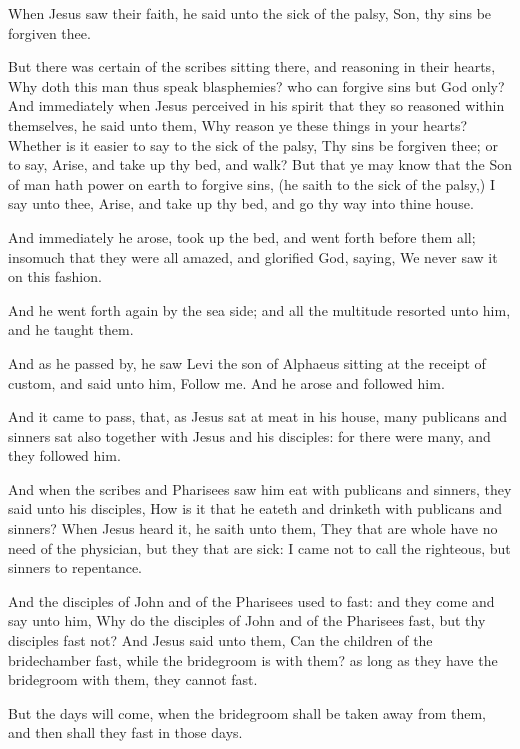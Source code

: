 \verse When Jesus saw their faith, he said unto the sick of the palsy, Son, thy sins be forgiven thee.

\verse But there was certain of the scribes sitting there, and reasoning in their hearts, \verse Why doth this man thus speak blasphemies? who can forgive sins but God only?  \verse And immediately when Jesus perceived in his spirit that they so reasoned within themselves, he said unto them, Why reason ye these things in your hearts?  \verse Whether is it easier to say to the sick of the palsy, Thy sins be forgiven thee; or to say, Arise, and take up thy bed, and walk?  \verse But that ye may know that the Son of man hath power on earth to forgive sins, (he saith to the sick of the palsy,) \verse I say unto thee, Arise, and take up thy bed, and go thy way into thine house.

\verse And immediately he arose, took up the bed, and went forth before them all; insomuch that they were all amazed, and glorified God, saying, We never saw it on this fashion.

\verse And he went forth again by the sea side; and all the multitude resorted unto him, and he taught them.

\verse And as he passed by, he saw Levi the son of Alphaeus sitting at the receipt of custom, and said unto him, Follow me. And he arose and followed him.

\verse And it came to pass, that, as Jesus sat at meat in his house, many publicans and sinners sat also together with Jesus and his disciples: for there were many, and they followed him.

\verse And when the scribes and Pharisees saw him eat with publicans and sinners, they said unto his disciples, How is it that he eateth and drinketh with publicans and sinners?  \verse When Jesus heard it, he saith unto them, They that are whole have no need of the physician, but they that are sick: I came not to call the righteous, but sinners to repentance.

\verse And the disciples of John and of the Pharisees used to fast: and they come and say unto him, Why do the disciples of John and of the Pharisees fast, but thy disciples fast not?  \verse And Jesus said unto them, Can the children of the bridechamber fast, while the bridegroom is with them? as long as they have the bridegroom with them, they cannot fast.

\verse But the days will come, when the bridegroom shall be taken away from them, and then shall they fast in those days.

